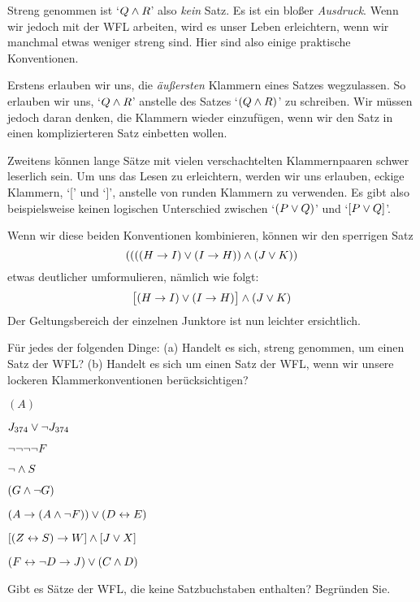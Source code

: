 Streng genommen ist `$Q \wedge R$' also \emph{kein} Satz. Es ist ein blo{\ss}er \emph{Ausdruck}. Wenn wir jedoch mit der WFL arbeiten, wird es unser Leben erleichtern, wenn wir manchmal etwas weniger streng sind. Hier sind also einige praktische Konventionen.

Erstens erlauben wir uns, die \emph{äu{\ss}ersten} Klammern eines Satzes wegzulassen. So erlauben wir uns, `$Q \wedge R$' anstelle des Satzes `$(Q \wedge R)$' zu schreiben. Wir müssen jedoch daran denken, die Klammern wieder einzufügen, wenn wir den Satz in einen komplizierteren Satz einbetten wollen.

Zweitens können lange Sätze mit vielen verschachtelten Klammernpaaren schwer leserlich sein. Um uns das Lesen zu erleichtern, werden wir uns erlauben, eckige Klammern, `[' und `]', anstelle von runden Klammern zu verwenden. Es gibt also beispielsweise keinen logischen Unterschied zwischen `$(P\vee Q)$' und `$[P\vee Q]$'. 

Wenn wir diese beiden Konventionen kombinieren, können wir den sperrigen Satz
$$((((H \rightarrow I) \vee (I \rightarrow H)) \wedge (J \vee K))$$
etwas deutlicher umformulieren, nämlich wie folgt:
$$\bigl[(H \rightarrow I) \vee (I \rightarrow H)\bigr] \wedge (J \vee K)$$
Der Geltungsbereich der einzelnen Junktore ist nun leichter ersichtlich.

\practiceproblems

\solutions
\problempart
\label{pr.wiffTFL}
Für jedes der folgenden Dinge: (a) Handelt es sich, streng genommen, um einen Satz der WFL? (b) Handelt es sich um einen Satz der WFL, wenn wir unsere lockeren Klammerkonventionen berücksichtigen?

\begin{earg}
\item $(A)$
\item $J_{374} \vee \neg J_{374}$
\item $\neg \neg \neg \neg F$
\item $\neg \wedge S$
\item $(G \wedge \neg G)$
\item $(A \rightarrow (A \wedge \neg F)) \vee (D \leftrightarrow E)$
\item $[(Z \leftrightarrow S) \rightarrow W] \wedge [J \vee X]$
\item $(F \leftrightarrow \neg D \rightarrow J) \vee (C \wedge D)$
\end{earg}

\problempart
Gibt es Sätze der WFL, die keine Satzbuchstaben enthalten? Begründen Sie.\\

